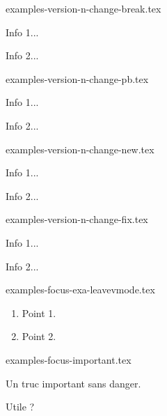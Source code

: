 \begin{filecontents*}[overwrite]{examples-version-n-change-break.tex}
\begin{tdocbreak}
    \item Info 1...
    \item Info 2...
\end{tdocbreak}
\end{filecontents*}


\begin{filecontents*}[overwrite]{examples-version-n-change-pb.tex}
\begin{tdocprob}
    \item Info 1...
    \item Info 2...
\end{tdocprob}
\end{filecontents*}


\begin{filecontents*}[overwrite]{examples-version-n-change-new.tex}
\begin{tdocnew}
    \item Info 1...
    \item Info 2...
\end{tdocnew}
\end{filecontents*}


\begin{filecontents*}[overwrite]{examples-version-n-change-fix.tex}
\begin{tdocfix}
    \item Info 1...
    \item Info 2...
\end{tdocfix}
\end{filecontents*}


\begin{filecontents*}[overwrite]{examples-focus-exa-leavevmode.tex}
\begin{tdocexa}
    \leavevmode

    \begin{enumerate}
        \item Point 1.

        \item Point 2.
    \end{enumerate}
\end{tdocexa}
\end{filecontents*}


\begin{filecontents*}[overwrite]{examples-focus-important.tex}
\begin{tdocimportant}
    Un truc important sans danger.
\end{tdocimportant}

\begin{tdocimportant}
    Utile ?
\end{tdocimportant}
\end{filecontents*}


